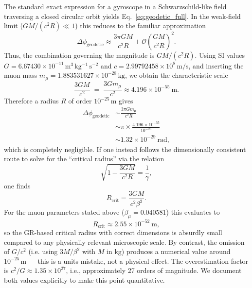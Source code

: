 \documentclass[%
 reprint,
 amsmath,amssymb,
 aps,
]{revtex4-1}
\numberwithin{equation}{section}
\begin{document}
The standard exact expression for a gyroscope in a Schwarzschild-like field traversing a closed circular orbit yields Eq.~\eqref{eq:geodetic_full}. In the weak-field limit ($GM/(c^{2}R)\ll1$) this reduces to the familiar approximation
\begin{equation}
\Delta\phi_{\mathrm{geodetic}}\approx \frac{3\pi GM}{c^{2}R} + \mathcal{O}\!\left(\frac{GM}{c^{2}R}\right)^{2}.
\label{eq:geodetic_weak}
\end{equation}
Thus, the combination governing the magnitude is $GM/(c^{2}R)$. Using SI values $G=6.67430\times10^{-11}\,\mathrm{m^{3}\,kg^{-1}\,s^{-2}}$ and $c=2.99792458\times10^{8}\,\mathrm{m/s}$, and inserting the muon mass $m_{\mu}=1.883531627\times10^{-28}\,\mathrm{kg}$, we obtain the characteristic scale
\begin{equation}
\frac{3GM}{c^{2}} \;=\; \frac{3Gm_{\mu}}{c^{2}} \approx 4.196\times10^{-55}\ \mathrm{m}.
\label{eq:3GM_over_c2}
\end{equation}
Therefore a radius $R$ of order $10^{-25}\,\mathrm{m}$ gives
\begin{align}
\Delta\phi_{\mathrm{geodetic}} &\sim \frac{3\pi G m_\mu}{c^{2} R} \label{eq:geodetic_estimate_a}\\
&\sim \pi\times\frac{4.196\times10^{-55}}{10^{-25}} \label{eq:geodetic_estimate_b}\\
&\sim 1.32\times10^{-29}\ \mathrm{rad}, \label{eq:geodetic_estimate_c}
\end{align}
which is completely negligible. If one instead follows the dimensionally consistent route to solve for the ``critical radius'' via the relation
\begin{equation}
\sqrt{1-\frac{3GM}{c^{2}R}}=\frac{1}{\gamma},
\label{eq:crit_condition_dim}
\end{equation}
one finds
\begin{equation}
R_{\text{crit}}=\frac{3GM}{c^{2}\beta^{2}}.
\label{eq:Rcrit_withG}
\end{equation}
For the muon parameters stated above ($\beta_{\mu}=0.040581$) this evaluates to
\begin{equation}
R_{\text{crit}} \approx 2.55\times 10^{-52}\ \mathrm{m},
\label{eq:Rcrit_withG_num}
\end{equation}
so the GR-based critical radius with correct dimensions is absurdly small compared to any physically relevant microscopic scale. By contrast, the omission of $G/c^{2}$ (i.e. using $3M/\beta^{2}$ with $M$ in kg) produces a numerical value around $10^{-25}\,\mathrm{m}$ --- this is a units mistake, not a physical effect. The overestimation factor is $c^2/G \approx 1.35 \times 10^{27}$, i.e., approximately 27 orders of magnitude. We document both values explicitly to make this point quantitative.
\end{document}
